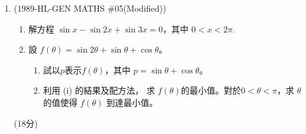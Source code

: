 \documentclass[12pt]{article}
\begin{document}
\begin{enumerate}
        \hrulefill
        
        \hrulefill
        
        \hrulefill

    \pagebreak
        \item (1989-HL-GEN MATHS \#05(Modified))  \begin{enumerate}
            \item 解方程 $\sin{x}-\sin{2x}+\sin{3x}=0$，其中 $0<x<2\pi$.
            \item 設 $f(\theta)=\sin{2\theta}+\sin{\theta}+\cos{\theta}$。\begin{enumerate}
                \item 試以$p$表示$f(\theta)$，其中 $p=\sin{\theta}+\cos{\theta}$。
                \item 利用 (i) 的結果及配方法， 求 $f(\theta)$的最小值。對於$0<\theta<\pi$，求 $\theta$ 的值使得 $f(\theta)$ 到達最小值。
            \end{enumerate}
        \end{enumerate}\hfill(18分)

        \hrulefill
            
            \hrulefill
            
            \hrulefill
            
            \hrulefill
            
            \hrulefill
            
            \hrulefill
            
            \hrulefill
            
            \hrulefill
            
            \hrulefill
            
            \hrulefill
            
            \hrulefill
            
            \hrulefill
            
            \hrulefill
            
            \hrulefill
            
            \hrulefill
            
            \hrulefill
            
            \hrulefill
            
            \hrulefill
            
            \hrulefill
            
            \hrulefill
            

\end{enumerate}
\end{document}
